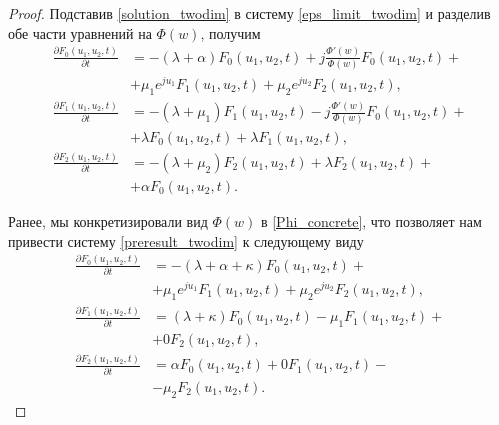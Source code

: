 \begin{proof}
	Подставив \eqref{solution_twodim} в систему \eqref{eps_limit_twodim} и разделив обе части уравнений на $\Phi(w)$, получим
	\begin{equation} \label{preresult_twodim}
		\begin{split}
			\frac{{\partial F_{0}(u_{1},u_{2},t)}}{{\partial t}} &= -(\lambda + \alpha)F_{0}(u_{1},u_{2},t) + j
			\frac{\Phi'(w) }{\Phi(w)}F_{0}(u_{1},u_{2},t) +\\  &+ \mu_{1} e^{ju_{1}}F_{1}(u_{1},u_{2},t) + \mu_{2}e^{ju_{2}}F_{2}(u_{1},u_{2},t) ,
			\\
			\frac{{\partial F_{1}(u_{1},u_{2},t)}}{{\partial t}} &= -(\lambda + \mu_{1})F_{1}(u_{1},u_{2},t) - j 
			\frac{\Phi'(w) }{\Phi(w)}F_{0}(u_{1},u_{2},t) +\\  &+ \lambda F_{0}(u_{1},u_{2},t) + \lambda F_{1}(u_{1},u_{2},t) ,
			\\
			\frac{{\partial F_{2}(u_{1},u_{2},t)}}{{\partial t}} &= -(\lambda + \mu_{2})F_{2}(u_{1},u_{2},t)  + \lambda F_{2}(u_{1},u_{2},t) +\\  &+ \alpha F_{0}(u_{1},u_{2},t).
		\end{split}
	\end{equation}  

	Ранее, мы конкретизировали вид $\Phi(w)$ в \eqref{Phi_concrete}, что позволяет нам привести систему \eqref{preresult_twodim} к следующему виду	
	\begin{equation} \label{result_twodim}
		\begin{split}
			\frac{{\partial F_{0}(u_{1},u_{2},t)}}{{\partial t}} &= -(\lambda + \alpha+ \kappa)F_{0}(u_{1},u_{2},t) + \\  &+ \mu_{1} e^{ju_{1}}F_{1}(u_{1},u_{2},t) + \mu_{2}e^{ju_{2}}F_{2}(u_{1},u_{2},t) ,
			\\
			\frac{{\partial F_{1}(u_{1},u_{2},t)}}{{\partial t}} &= (\lambda + \kappa)F_{0}(u_{1},u_{2},t) -  
			\mu_{1}F_{1}(u_{1},u_{2},t) +\\  &+  0F_{2}(u_{1},u_{2},t) ,
			\\
			\frac{{\partial F_{2}(u_{1},u_{2},t)}}{{\partial t}} &= \alpha F_{0}(u_{1},u_{2},t)   +  0F_{1}(u_{1},u_{2},t) -\\  &- \mu_{2}F_{2}(u_{1},u_{2},t).
		\end{split}
	\end{equation}  


\end{proof}
